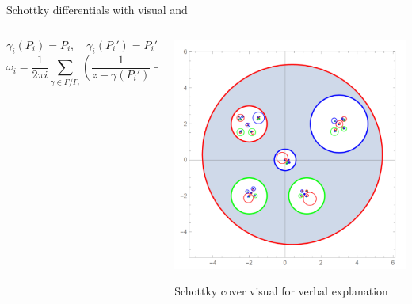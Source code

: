 \documentclass[11pt,aspectratio=169]{beamer}
\begin{document}
\begin{frame}{Schottky differentials with visual}{\tiny \cite{ComputationalSchottky} and \cite{Cha22}}
    \begin{columns}
        \begin{column}{0.5\textwidth}
            \center
            \[\gamma_i(P_i)=P_i, \quad \gamma_i(P_i')=P_i'\]        
            \[\omega_i = \frac{1}{2\pi i}\sum_{\gamma \in \Gamma / \Gamma_i} \left(\frac{1}{z-\gamma(P_i')} - \frac{1}{z-\gamma(P_i)}\right)dz\]
        \end{column}
        \begin{column}{0.5\textwidth}
            \center{}
            \includegraphics[width=0.9\columnwidth]{assets/ChanSchottkyCover2.png}
        
            \tiny Schottky cover visual for verbal explanation
        
            \cite{Cha22}
        \end{column}
    \end{columns}
\end{frame}
\end{document}
